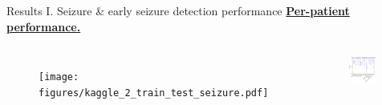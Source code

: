 \documentclass[final,t,overlay, xcolor=table, sans, mathserif]{beamer}
\begin{document}
\begin{frame}{}
\begin{columns}[t]
\begin{column}{.4\linewidth}
\begin{block}{Results I. Seizure \& early seizure detection performance}
\centering
\underline{\bf Per-patient performance.} \\
\begin{columns}
\vspace{-1cm}
\begin{figure}
\texttt{[image: figures/kaggle\_2\_train\_test\_seizure.pdf]}
\end{figure}
\vspace{-1cm}
\begin{figure}
\includegraphics[width=0.9\textwidth]{figures/kaggle_2_train_test_early.pdf}
\end{figure}
\end{columns}
\end{block}


\end{column}
\end{columns}
\end{frame}
\end{document}
